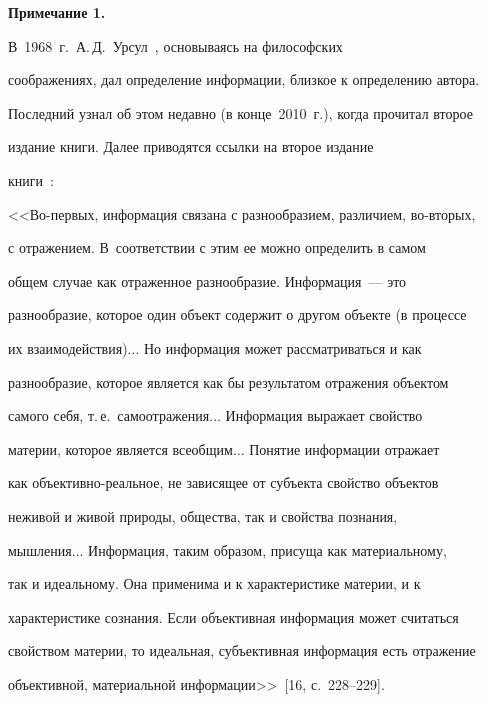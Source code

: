 \smallskip





{\small\noindent


\textbf{Примечание 1.} 


   В~1968~г.\ А.\,Д.~Урсул~\cite{15-2-15}, основываясь на философских 


со\-об\-ра\-же\-ни\-ях, дал определение информации, близкое к определению автора. 


Последний узнал об этом недавно (в конце~2010~г.), когда прочитал второе 


издание книги. Далее приводятся ссылки на второе издание 


   книги~\cite{16-2-15}:


   


   <<Во-первых, информация связана с разнообразием, различием, во-вто\-рых, 


   с отражением. В~соответствии с этим ее можно определить в самом 


общем случае как отраженное разнообразие. Информация~--- это 


разнообразие, которое один объект содержит о другом объекте (в процессе 


их взаимодействия)$\ldots$ Но информация может рассматриваться и как 


разнообразие, которое является как бы результатом отражения объектом 


самого себя, т.\,е.\ самоотражения$\ldots$ Информация выражает свойство 


материи, которое является всеобщим$\ldots$ Понятие информации отражает 


как объективно-реальное, не зависящее от субъекта свойство объектов 


неживой и живой природы, общества, так и свойства познания, 


мышления$\ldots$ Информация, таким образом, присуща как материальному, 


так и идеальному. Она применима и к характеристике материи, и к 


характеристике сознания. Если объективная информация может считаться 


свойством материи, то идеальная, субъективная информация есть отражение 


объективной, материальной информации>>~[16, с.~228--229].


   


}

